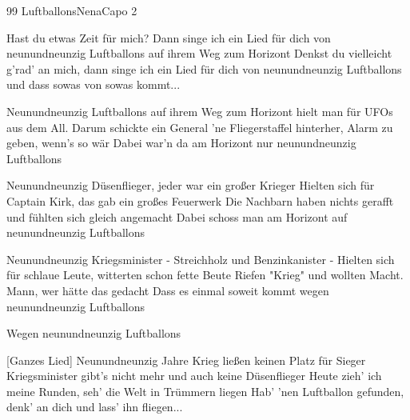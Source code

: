 \begin{song}{99 Luftballons}{Nena}{Capo 2}

Hast du etwas Zeit für mich? Dann singe ich ein Lied für dich
von neunundneunzig Luftballons auf ihrem Weg zum Horizont
Denkst du vielleicht g'rad' an mich, dann singe ich ein Lied für dich
von neunundneunzig Luftballons und dass sowas von sowas kommt...

Neunundneunzig Luftballons auf ihrem Weg zum Horizont
hielt man für UFOs aus dem All. Darum schickte ein General 
'ne Fliegerstaffel hinterher, Alarm zu geben, wenn's so wär
Dabei war'n da am Horizont nur neunundneunzig Luftballons

Neunundneunzig Düsenflieger, jeder war ein großer Krieger
Hielten sich für Captain Kirk, das gab ein großes Feuerwerk
Die Nachbarn haben nichts gerafft und fühlten sich gleich angemacht
Dabei schoss man am Horizont auf neunundneunzig Luftballons

Neunundneunzig Kriegsminister - Streichholz und Benzinkanister -
Hielten sich für schlaue Leute, witterten schon fette Beute
Riefen "Krieg" und wollten Macht. Mann, wer hätte das gedacht
Dass es einmal soweit kommt wegen neunundneunzig Luftballons

         Wegen neunundneunzig Luftballons

[Ganzes Lied]
\newpage
{}
Neunundneunzig Jahre Krieg ließen keinen Platz für Sieger
Kriegsminister gibt's nicht mehr und auch keine Düsenflieger
Heute zieh' ich meine Runden, seh' die Welt in Trümmern liegen
Hab' 'nen Luftballon gefunden, denk' an dich und lass' ihn fliegen...
\end{song}
